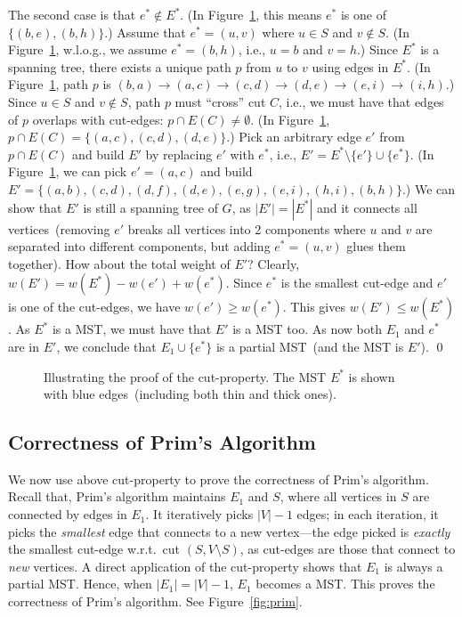 The second case is that $e^* \not\in E^*$.
(In Figure~\ref{fig:proof}, this means $e^*$ is one of $\{(b,e),(b,h)\}$.)
Assume that $e^* = (u,v)$ where $u\in S$ and $v\notin S$.
(In Figure~\ref{fig:proof}, w.l.o.g., we assume $e^* = (b,h)$, i.e., $u= b$ and $v=h$.)
Since $E^*$ is a spanning tree, there exists a unique path $p$ from $u$ to $v$ using edges in $E^*$.
(In Figure~\ref{fig:proof}, path $p$ is $(b,a)\to(a,c)\to(c,d)\to(d,e)\to(e,i)\to(i,h)$.)
Since $u\in S$ and $v\notin S$, path $p$ must ``cross'' cut $C$, i.e., 
we must have that edges of $p$ overlaps with cut-edges: $p\cap E(C)\neq \emptyset$.
(In Figure~\ref{fig:proof}, $p\cap E(C) = \{(a,c),(c,d),(d,e)\}$.)
Pick an arbitrary edge $e'$ from $p\cap E(C)$ and build
$E'$ by replacing $e'$ with $e^*$, i.e., $E' = E^* \setminus \{e'\} \cup \{e^*\}$.
(In Figure~\ref{fig:proof}, we can pick $e' = (a,c)$ and build $E' = \{(a,b),(c,d),(d,f),(d,e),(e,g),(e,i),(h,i),(b,h)\}$.)
We can show that $E'$ is still a spanning tree of $G$, as $|E'| = |E^*|$ and it connects all vertices~(removing $e'$ breaks
all vertices into 2 components where $u$ and $v$ are separated into different components, but adding $e^* = (u,v)$ glues them together).
How about the total weight of $E'$? Clearly, $w(E') = w(E^*) - w(e') + w(e^*)$.
Since $e^*$ is the smallest cut-edge and $e'$ is one of the cut-edges, we have $w(e') \ge w(e^*)$.
This gives $w(E') \le w(E^*)$. As $E^*$ is a MST, we must have that $E'$ is a MST too.
As now both $E_1$ and $e^*$ are in $E'$, we conclude that $E_1\cup \{e^*\}$ is a partial MST~(and the MST is $E'$). \qed

\begin{figure}[h]
\centering{}
\caption{Illustrating the proof of the cut-property. The MST $E^*$ is shown with blue edges~(including both thin and thick ones).}
\label{fig:proof}
\end{figure}

\subsection*{Correctness of Prim's Algorithm}


We now use above cut-property to prove the correctness of Prim's algorithm.
Recall that, Prim's algorithm maintains $E_1$ and $S$, where all vertices in $S$ are connected by edges in $E_1$.
It iteratively picks $|V|-1$ edges;
in each iteration, it picks the \emph{smallest} edge that connects to a new vertex---the edge picked
is \emph{exactly} the smallest cut-edge w.r.t.\ cut $(S,V\setminus S)$,
as cut-edges are those that connect to \emph{new} vertices.
A direct application of the cut-property shows that $E_1$ is always a partial MST.
Hence, when $|E_1| = |V|-1$, $E_1$ becomes a MST.
This proves the correctness of Prim's algorithm.
See Figure~\ref{fig:prim}.

